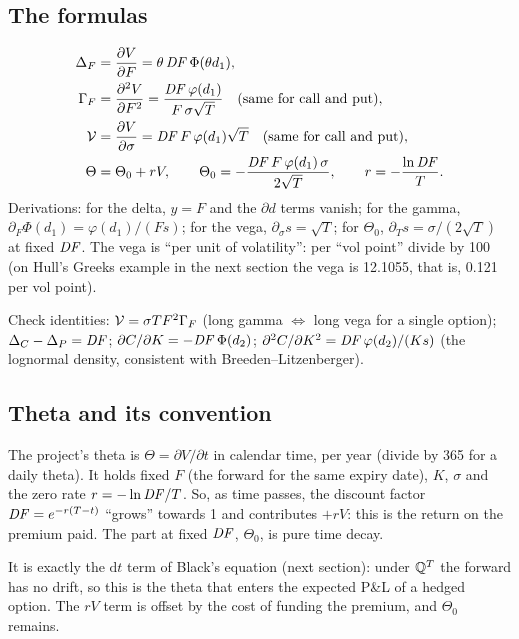 \subsection{The formulas}
\begin{align}
\Delta_F&=\frac{\partial V}{\partial F}=\theta\,\mathit{DF}\,\Phi(\theta d_1),\label{eq:delta}\\
\Gamma_F&=\frac{\partial^2V}{\partial F^2}=\frac{\mathit{DF}\,\varphi(d_1)}{F\,\sigma\sqrt T}\quad\text{(same for call and put)},\label{eq:gamma}\\
\mathcal{V}&=\frac{\partial V}{\partial\sigma}=\mathit{DF}\,F\,\varphi(d_1)\sqrt T\quad\text{(same for call and put)},\label{eq:vega}\\
\Theta&=\Theta_0+rV,\qquad\Theta_0=-\frac{\mathit{DF}\,F\,\varphi(d_1)\,\sigma}{2\sqrt T},\qquad r=-\frac{\ln\mathit{DF}}{T}.\label{eq:theta}
\end{align}
Derivations: for the delta, $y=F$ and the $\partial d$ terms vanish; for the gamma, $\partial_F\Phi(d_1)=\varphi(d_1)/(Fs)$;
for the vega, $\partial_\sigma s=\sqrt T$; for $\Theta_0$, $\partial_Ts=\sigma/(2\sqrt T)$ at fixed $\mathit{DF}$. The vega is
``per unit of volatility'': per ``vol point'' divide by 100 (on Hull's Greeks example in the next section the vega is
12.1055, that is, 0.121 per vol point).

Check identities: $\mathcal{V}=\sigma T F^2\Gamma_F$ (long gamma $\Leftrightarrow$ long vega for a single option);
$\Delta_C-\Delta_P=\mathit{DF}$; $\partial C/\partial K=-\mathit{DF}\,\Phi(d_2)$; $\partial^2C/\partial K^2=\mathit{DF}\,\varphi(d_2)/(Ks)$ (the
lognormal density, consistent with Breeden--Litzenberger).

\subsection{Theta and its convention}
The project's theta is $\Theta=\partial V/\partial t$ in calendar time, per year (divide by 365 for a daily theta).
It holds fixed $F$ (the forward for the same expiry date), $K$, $\sigma$ and the zero rate $r=-\ln\mathit{DF}/T$. So, as time
passes, the discount factor $\mathit{DF}=e^{-r(T-t)}$ ``grows'' towards 1 and contributes $+rV$: this is the return on the
premium paid. The part at fixed $\mathit{DF}$, $\Theta_0$, is pure time decay.

\begin{perche}[title={Why this convention?}]
It is exactly the $\mathrm{d}t$ term of Black's equation (next section): under $\mathbb{Q}^T$ the forward has no drift, so
this is the theta that enters the expected P\&L of a hedged option. The $rV$ term is offset by the cost of funding
the premium, and $\Theta_0$ remains.
\end{perche}

